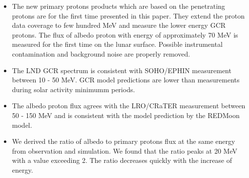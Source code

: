 \begin{itemize}
    \item  The new primary protons products which are based on the penetrating protons are for the first time presented in this paper. They extend the proton data coverage to few hundred MeV and measure the lower energy \ac{GCR} protons. The flux of albedo proton with energy of approximately 70 MeV is measured for the first time on the lunar surface. Possible instrumental contamination and background noise are properly removed.
    \item The \ac{LND} \ac{GCR} spectrum is consistent with \ac{SOHO}/\ac{EPHIN} measurement between 10 - 50 MeV. \ac{GCR} model predictions are lower than measurements during solar activity minimumm periods.
    \item  The albedo proton flux agrees with the \ac{LRO}/\ac{CRaTER} measurement between 50 - 150 MeV and is consistent with the model prediction by the \ac{REDMoon} model.
    \item We derived the ratio of albedo to primary protons flux at the same energy from observation and simulation. We found that the ratio peaks at 20 MeV with a value exceeding 2. The ratio decreases quickly with the increase of energy.
\end{itemize}



